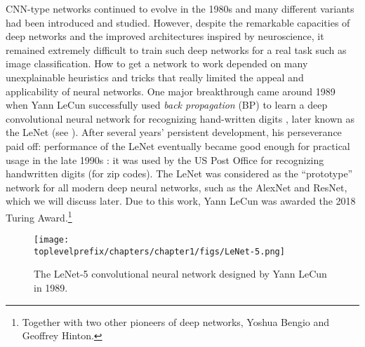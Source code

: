 \documentclass[../../book-main.tex]{subfiles}
\begin{document}
CNN-type networks continued to evolve in the 1980s and many different variants had been introduced and studied. However, despite the remarkable capacities of deep networks and the improved architectures inspired by neuroscience, it remained extremely difficult to train such deep networks for a real task such as image classification. How to get a network to work depended on many unexplainable heuristics and tricks that really limited the appeal and applicability of neural networks. One major breakthrough came around 1989 when Yann LeCun successfully used {\em back propagation} (BP) to learn a deep convolutional neural network for recognizing hand-written digits \cite{LeCun-1989}, later known as the LeNet (see ). After several years' persistent development, his perseverance paid off: performance of the LeNet eventually became good enough for practical usage in the late 1990s \cite{LeCun-1998}: it was used by the US Post Office for recognizing handwritten digits (for zip codes).  The LeNet was considered as the ``prototype'' network for all modern deep neural networks, such as the AlexNet and ResNet, which we will discuss later. Due to this work, Yann LeCun was awarded the 2018 Turing Award.\footnote{Together with two other pioneers of deep networks, Yoshua Bengio and Geoffrey Hinton.}

\begin{figure}
    \centering
\texttt{[image: \\toplevelprefix/chapters/chapter1/figs/LeNet-5.png]}
    \caption{The LeNet-5 convolutional neural network designed by Yann LeCun in 1989. }
    \label{fig:LeNet-5}
\end{figure}
\end{document}
